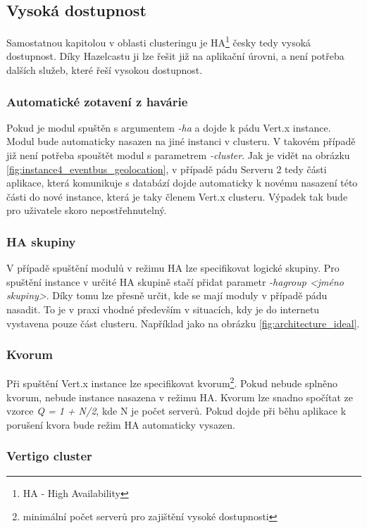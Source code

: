 \subsection{Vysoká dostupnost}

Samostatnou kapitolou v oblasti clusteringu je HA\footnote{HA - High Availability} česky tedy vysoká dostupnost. Díky Hazelcastu ji lze řešit již na aplikační úrovni, a není potřeba  dalších služeb, které řeší vysokou dostupnost.

\subsubsection{Automatické zotavení z havárie}

Pokud je modul spuštěn s argumentem \emph{-ha} a dojde k pádu Vert.x instance. Modul bude automaticky nasazen na jiné instanci v clusteru. V takovém případě již není potřeba spouštět modul s parametrem \emph{-cluster}. Jak je vidět na obrázku \ref{fig:instance4_eventbus_geolocation}, v případě pádu Serveru 2 tedy části aplikace, která komunikuje s databází dojde automaticky k novému nasazení této části do nové instance, která je taky členem Vert.x clusteru. Výpadek tak bude pro uživatele skoro nepostřehnutelný.

\subsubsection{HA skupiny}

V případě spuštění modulů v režimu HA lze specifikovat logické skupiny. Pro spuštění instance v určité HA skupině stačí přidat parametr \emph{-hagroup <jméno skupiny>}. Díky tomu lze přesně určit, kde se mají moduly v případě pádu nasadit. To je v praxi vhodné především v situacích, kdy je do internetu vystavena pouze část clusteru. Například jako na obrázku \ref{fig:architecture_ideal}.

\subsubsection{Kvorum}

Při spuštění Vert.x instance lze specifikovat kvorum\footnote{minimální počet serverů pro zajištění vysoké dostupnosti}. Pokud nebude splněno kvorum, nebude instance nasazena v režimu HA. Kvorum lze snadno spočítat ze vzorce \emph{Q = 1 + N/2}, kde N je počet serverů. Pokud dojde při běhu aplikace k porušení kvora bude režim HA automaticky vysazen.

\subsubsection{Vertigo cluster}

